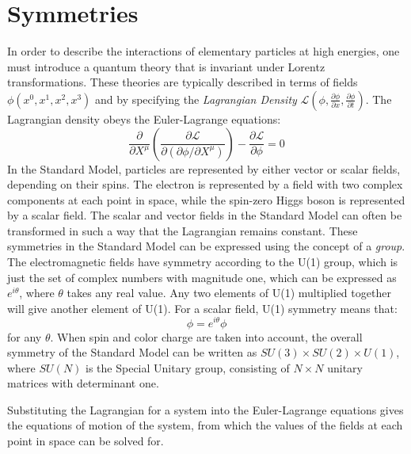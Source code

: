 \documentclass[10pt]{ucscthesisbs}
\begin{document}
\section{Symmetries}
In order to describe the interactions of elementary particles at high energies, one must introduce a quantum theory that is invariant under Lorentz transformations. These theories are typically described in terms of fields $\phi(x^0, x^1, x^2, x^3)$ and by specifying the \textit{Lagrangian Density} $\mathcal{L}(\phi, \frac{\partial \phi}{\partial x}, \frac{\partial \phi}{\partial t})$. \cite{tong} The Lagrangian density obeys the Euler-Lagrange equations:
\begin{equation}
\frac{\partial}{\partial X^{\mu}}(\frac{\partial \mathcal{L}}{\partial(\partial \phi/\partial X^{\mu})}) - \frac{\partial \mathcal{L}}{\partial \phi} = 0
\end{equation}
In the Standard Model, particles are represented by either vector or scalar fields, depending on their spins. The electron is represented by a field with two complex components at each point in space, while the spin-zero Higgs boson is represented by a scalar field. The scalar and vector fields in the Standard Model can often be transformed in such a way that the Lagrangian remains constant. These symmetries in the Standard Model can be expressed using the concept of a \textit{group}. The electromagnetic fields have symmetry according to the U(1) group, which is just the set of complex numbers with magnitude one, which can be expressed as $e^{i\theta}$, where $\theta$ takes any real value. Any two elements of U(1) multiplied together will give another element of U(1). For a scalar field, U(1) symmetry means that:
\begin{equation}
\phi = e^{i\theta}\phi
\end{equation}
for any $\theta$. When spin and color charge are taken into account, the overall symmetry of the Standard Model can be written as $SU(3) \times SU(2) \times U(1)$, where $SU(N)$ is the Special Unitary group, consisting of $N\times N$ unitary matrices with determinant one.\par

Substituting the Lagrangian for a system into the Euler-Lagrange equations gives the equations of motion of the system, from which the values of the fields at each point in space can be solved for. 
\end{document}
